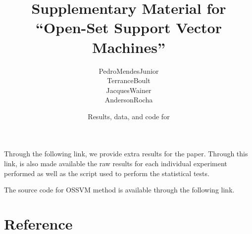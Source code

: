



\renewcommand\highlightauthorname[1]{#1}

\title{Supplementary Material for \\``Open-Set Support Vector Machines''}
\author{\gls{PedroMendesJunior}\\%
  \gls{TerranceBoult}\\%
  \gls{JacquesWainer}\\%
  \gls{AndersonRocha}\\%
}
\date{Results, data, and code for }



\maketitle

Through the following link, we provide extra results for the paper.
Through this link, is also made available the raw results for each individual experiment performed as well as the script used to perform the statistical tests.

\begin{center}
\end{center}

The source code for OSSVM method is available through the following link.

\begin{center}
\end{center}

\section*{Reference}

\begin{publications}
  \\

\end{publications}




